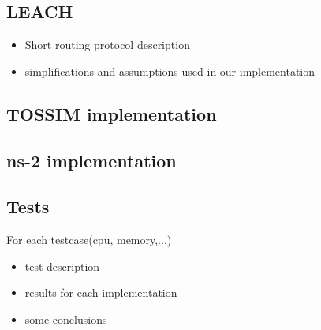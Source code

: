 \subsection{LEACH}
\begin{itemize}
    \item Short routing protocol description
    \item simplifications and assumptions used in our implementation
\end{itemize}

\subsection{TOSSIM implementation}
\todo

\subsection{ns-2 implementation}
\todo

\subsection{Tests}
For each testcase(cpu, memory,...)
\begin{itemize}
    \item{test description}
    \item{results for each implementation}
    \item{some conclusions}
\end{itemize}
